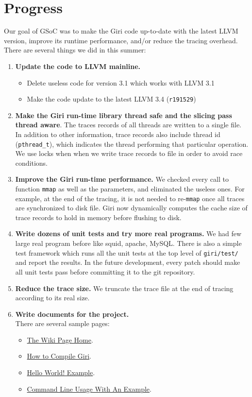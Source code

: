 \documentclass[DIV=calc, paper=a4, fontsize=11pt, twocolumn]{scrartcl}
\begin{document}
\section{Progress}
\label{sec:progress}
Our goal of GSoC was to make the Giri code up-to-date with the latest LLVM version, improve its runtime performance, and/or reduce the tracing overhead.
There are several things we did in this summer:
\begin{enumerate}
	\item \textbf{Update the code to LLVM mainline.}
		\begin{itemize}
			\item Delete useless code for version 3.1 which works with LLVM 3.1
			\item Make the code update to the latest LLVM 3.4 (\texttt{r191529})
		\end{itemize}
	\item \textbf{Make the Giri run-time library thread safe and the slicing pass thread aware}.
		The traces records of all threads are written to a single file.
		In addition to other information, trace records also include thread id (\texttt{pthread\_t}),
		which indicates the thread performing that particular operation.
		We use locks when when we write trace records to file in order to avoid race conditions.
	\item \textbf{Improve the Giri run-time performance.}
		We checked every call to function \texttt{mmap} as well as the parameters, and eliminated the useless ones.
		For example, at the end of the tracing, it is not needed to re-\texttt{mmap} once all traces are synchronized to disk file.
		Giri now dynamically computes the cache size of trace records to hold in memory before flushing to disk.
	\item \textbf{Write dozens of unit tests and try more real programs.}
		We had few large real program before like squid, apache, MySQL.
		There is also a simple test framework which runs all the unit tests at the top level of \texttt{giri/test/} and report the results.
		In the future development, every patch should make all unit tests pass before committing it to the git repository.
	\item \textbf{Reduce the trace size.}
		We truncate the trace file at the end of tracing according to its real size.
	\item \textbf{Write documents for the project.}\\
		There are several sample pages:
		\begin{itemize}
			\item \href{https://github.com/liuml07/giri/wiki}{The Wiki Page Home}.
			\item \href{https://github.com/liuml07/giri/wiki/How-to-Compile-Giri}{How to Compile Giri}.
			\item \href{https://github.com/liuml07/giri/wiki/Hello-World}{Hello World! Example}.
			\item \href{https://github.com/liuml07/giri/wiki/Example-Usage}{Command Line Usage With An Example}.
		\end{itemize}
\end{enumerate}
\end{document}

